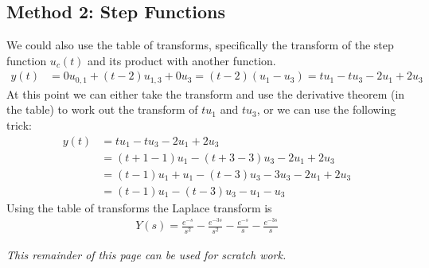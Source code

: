 {    \subsection*{Method 2: Step Functions}
    We could also use the table of transforms, specifically the transform of the step function $u_c(t)$ and its product with another function. 
    \begin{align}
        y(t) &= 0u_{0,1} + (t-2)u_{1,3} + 0u_{3} 
        =(t-2)(u_1-u_3) 
        = tu_1-tu_3 - 2u_1 + 2 u_3 
    \end{align}   
    At this point we can either take the transform and use the derivative theorem (in the table) to work out the transform of $tu_1$ and $tu_3$, or we can use the following trick:
    \begin{align}
        y(t) &= tu_1-tu_3 - 2u_1 + 2 u_3 \\
        &= (t+1-1)u_1-(t+3-3)u_3 - 2u_1 + 2 u_3 \\
        &= (t-1)u_1 + u_1 -(t-3)u_3 - 3u_3 - 2u_1 + 2 u_3 \\
        &= (t-1)u_1 -(t-3)u_3 - u_1 - u_3 
    \end{align}
    Using the table of transforms the Laplace transform is
    \begin{align}
        Y(s) = \frac{e^{-s}}{s^2} - \frac{e^{-3s}}{s^2} - \frac{e^{-s}}{s} - \frac{e^{-3s}}{s}
    \end{align}
} 
\else 
    \vfill
    \begin{center}
        \textit{This remainder of this page can be used for scratch work. }
    \end{center}
    \vfill
\fi
\fi



